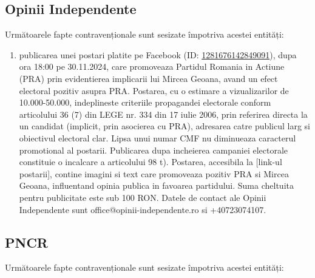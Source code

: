 \documentclass[a4paper,12pt]{article}
\begin{document}
\vspace{0.5cm}

\subsection{Opinii Independente}
Următoarele fapte contravenționale sunt sesizate împotriva acestei entități:

\begin{enumerate}[leftmargin=*, label=\arabic*.)]
    \item publicarea unei postari platite pe Facebook (ID: \href{https://www.facebook.com/ads/library/?id=1281676142849091}{1281676142849091}), dupa ora 18:00 pe 30.11.2024, care promoveaza Partidul Romania in Actiune (PRA) prin evidentierea implicarii lui Mircea Geoana, avand un efect electoral pozitiv asupra PRA. Postarea, cu o estimare a vizualizarilor de 10.000-50.000, indeplineste criteriile propagandei electorale conform articolului 36 (7) din LEGE nr. 334 din 17 iulie 2006, prin referirea directa la un candidat (implicit, prin asocierea cu PRA), adresarea catre publicul larg si obiectivul electoral clar.  Lipsa unui numar CMF nu diminueaza caracterul promotional al postarii.  Publicarea dupa incheierea campaniei electorale constituie o incalcare a articolului 98 t).  Postarea, accesibila la [link-ul postarii], contine imagini si text care promoveaza pozitiv PRA si Mircea Geoana, influentand opinia publica in favoarea partidului.  Suma cheltuita pentru publicitate este sub 100 RON.  Datele de contact ale Opinii Independente sunt office@opinii-independente.ro si +40723074107.
\end{enumerate}

\vspace{0.5cm}

\subsection{PNCR}
Următoarele fapte contravenționale sunt sesizate împotriva acestei entități:
\end{document}
